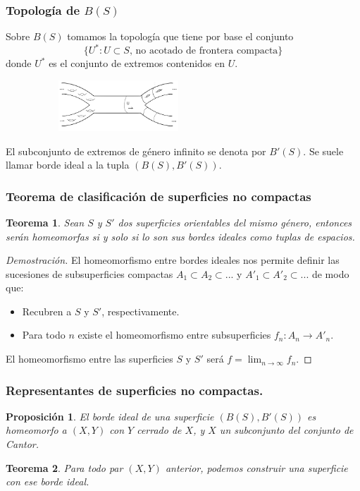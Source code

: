\documentclass{beamer}
\newtheorem*{teor}{Teorema}
\newtheorem*{prop}{Proposición}
\begin{document}
\begin{frame}
\frametitle{Topología de $B(S)$}
Sobre $B(S)$ tomamos la topología que tiene por base el conjunto \[\{U^*: U\subset S \text{, no acotado de frontera compacta}\}\]donde $U^*$ es el conjunto de extremos contenidos en $U$.
\begin{figure}[htb]
\begin{center}
\includegraphics[width=2.5in,height=0.75in]{imagenes/diapoX.png} 
\end{center}
\end{figure}

El subconjunto de extremos de género infinito se denota por $B'(S)$. Se suele llamar borde ideal a la tupla $(B(S), B'(S))$.
\end{frame}
 

\begin{frame}
\frametitle{Teorema de clasificación de superficies no compactas}

\begin{teor}
Sean $S$ y $S'$ dos superficies orientables del mismo género, entonces serán homeomorfas si y solo si lo son sus bordes ideales como tuplas de espacios.
\end{teor}

\begin{proof}[Demostración]
El homeomorfismo entre bordes ideales nos permite definir las sucesiones de subsuperficies compactas $A_1 \subset A_2 \subset ...$ y $A'_1 \subset A'_2 \subset ...$ de modo que:
\begin{itemize}
\item Recubren a $S$ y $S'$, respectivamente.
\item Para todo $n$ existe el homeomorfismo entre subsuperficies $f_n: A_n \longrightarrow A'_n$.
\end{itemize} 
El homeomorfismo entre las superficies $S$ y $S'$ será $f = \lim_{n\to\infty} f_n$.

\end{proof}

\end{frame}


\begin{frame}
\frametitle{Representantes de superficies no compactas.}


\begin{prop}
El borde ideal de una superficie $(B(S), B'(S))$ es homeomorfo a $(X,Y)$ con $Y$ cerrado de $X$, y $X$ un subconjunto del conjunto de Cantor.
\end{prop}

\begin{teor}
Para todo par $(X,Y)$ anterior, podemos construir una superficie con ese borde ideal.
\end{teor}


\end{frame}
\end{document}
